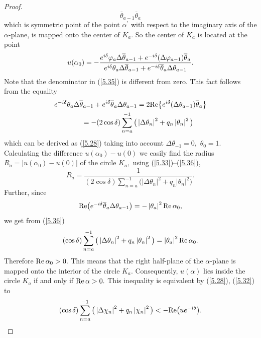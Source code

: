 \documentclass[11pt]{article}
\numberwithin{equation}{section}
\begin{document}
\begin{proof}
\[{\overline{\theta }_{a-1}}{\overline{\theta }_{a}}
\]%
which is symmetric point of the point $\alpha ^{\prime }$ with respect to
the imaginary axis of the $\alpha $-plane, is mapped onto the center of $%
K_{a}.$ So the center of $K_{a}$ is located at the point%
\begin{equation}
u(\alpha _{0})=-\frac{e^{i\delta }\varphi _{a}\Delta \overline{\theta }%
_{a-1}+e^{-i\delta }(\Delta \varphi _{a-1})\overline{\theta }_{a}}{%
e^{i\delta }\theta _{a}\Delta \overline{\theta }_{a-1}+e^{-i\delta }%
\overline{\theta }_{a}\Delta \theta _{a-1}}.  \label{5.35}
\end{equation}%
Note that the denominator in (\ref{5.35}) is dif\/ferent from zero. This fact
follows from the equality%
\begin{gather}
e^{-i\delta }\theta _{a}\Delta \overline{\theta }_{a-1}+e^{i\delta }%
\overline{\theta }_{a}\Delta \theta _{a-1}=2{\rm Re}\big\{ e^{i\delta
}(\Delta \theta _{a-1})\overline{\theta }_{a}\big\}\nonumber\\
\qquad {}=-(2\cos \delta )\sum_{n=a}^{-1}\big( \left\vert \Delta \theta
_{n}\right\vert ^{2}+q_{n}\left\vert \theta _{n}\right\vert ^{2}\big)
\label{5.36}
\end{gather}%
which can be derived as (\ref{5.28}) taking into account $\Delta \theta
_{-1}=0,$ $\theta _{0}=1.$ Calculating the dif\/ference $u(\alpha _{0})-u(0)$
we easily f\/ind the radius $R_{a}=\left\vert u(\alpha _{0})-u(0)\right\vert $
of the circle $K_{a},$ using (\ref{5.33})--(\ref{5.36}),%
\[
R_{a}=\frac{1}{(2\cos \delta )\sum\limits_{n=a}^{-1}\big( \left\vert \Delta \theta
_{n}\right\vert ^{2}+q_{n}\left\vert \theta _{n}\right\vert ^{2}\big) }.
\]%
Further, since%
\[
{\rm Re}\big(e^{-i\delta }\overline{\theta }_{a}\Delta \theta
_{a-1}\big)=-\left\vert \theta _{a}\right\vert ^{2}{\rm Re}\,\alpha _{0},
\]%
we get from (\ref{5.36})%
\[
(\cos \delta )\sum_{n=a}^{-1}\big( \left\vert \Delta \theta _{n}\right\vert
^{2}+q_{n}\left\vert \theta _{n}\right\vert ^{2}\big) =\left\vert \theta
_{a}\right\vert ^{2}{\rm Re}\,\alpha _{0}.
\]%
Therefore ${\rm Re}\,\alpha _{0}>0.$ This means that the right half-plane
of the $\alpha $-plane is mapped onto the interior of the circle $K_{a}.$
Consequently, $u(\alpha )$ lies inside the circle $K_{a}$ if and only if $%
{\rm Re}\,\alpha >0.$ This inequality is equivalent by (\ref{5.28}), (\ref{5.32}) to
\begin{equation}
(\cos \delta )\sum_{n=a}^{-1}\big( \left\vert \Delta \chi _{n}\right\vert
^{2}+q_{n}\left\vert \chi _{n}\right\vert ^{2}\big) <-{\rm Re}
\big(ue^{-i\delta }\big).  \label{5.37}
\end{equation}


\end{proof}
\end{document}
